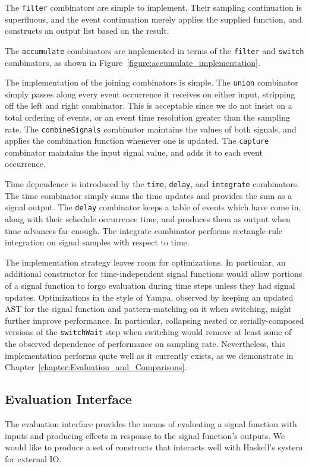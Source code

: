 The {\tt filter} combinators are simple to implement. Their sampling
continuation is superfluous, and the event continuation merely applies the
supplied function, and constructs an output list based on the result.

The {\tt accumulate} combinators are implemented in terms of the {\tt filter}
and {\tt switch} combinators, as shown in
Figure~\ref{figure:accumulate_implementation}.

The implementation of the joining combinators is simple. The {\tt union}
combinator simply passes along every event occurrence it receives on either
input, stripping off the left and right combinator. This is acceptable since we
do not insist on a total ordering of events, or an event time resolution greater
than the sampling rate. The {\tt combineSignals} combinator maintains the values
of both signals, and applies the combination function whenever one is updated.
The {\tt capture} combinator maintains the input signal value, and adds it to
each event occurrence.

Time dependence is introduced by the {\tt time}, {\tt delay}, and {\tt integrate}
combinators. The time combinator simply sums the time updates and provides the
sum as a signal output. The {\tt delay} combinator keeps a table of events
which have come in, along with their schedule occurrence time, and produces
them as output when time advances far enough. The integrate combinator performs
rectangle-rule integration on signal samples with respect to time.

The implementation strategy leaves room for optimizations. In particular, an
additional constructor for time-independent signal functions would allow
portions of a signal function to forgo evaluation during time steps unless they
had signal updates. Optimizations in the style of Yampa, observed by keeping
an updated AST for the signal function and pattern-matching on it when switching,
might further improve performance. In particular, collapsing nested or
serially-composed versions of the {\tt switchWait} step when switching would
remove at least some of the observed dependence of performance on sampling rate.
Nevertheless, this implementation performs quite well as it currently exists, as
we demonstrate in Chapter~\ref{chapter:Evaluation_and_Comparisons}.

\subsection{Evaluation Interface}
\label{subsection:Implementation-Evaluation_Interface}
The evaluation interface provides the means of evaluating a signal function
with inputs and producing effects in response to the signal function's outputs.
We would like to produce a set of constructs that interacts well with Haskell's
system for external IO.

